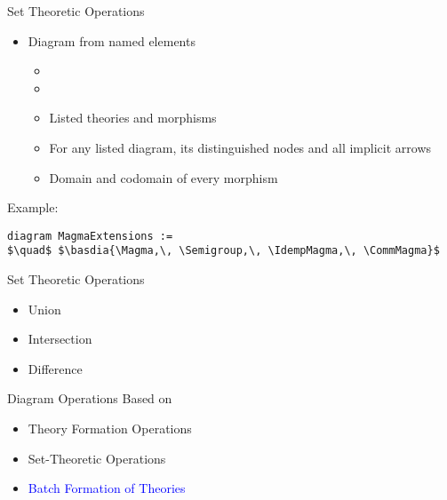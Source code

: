 \documentclass[t,12pt,numbers,fleqn,usenames,xcolor=dvipsnames]{beamer}
\begin{document}
\begin{frame}[fragile]{Set Theoretic Operations}
\begin{itemize}
	\item Diagram from named elements 
\begin{itemize}
	\item[]  
	\item[]
\pause
	\item Listed theories and morphisms 
	\item For any listed diagram, its distinguished nodes and all implicit arrows 
	\item Domain and codomain of every morphism
\end{itemize}
\end{itemize}

\pause
Example: 
\footnotesize
\begin{lstlisting}
diagram MagmaExtensions := 
$\quad$ $\basdia{\Magma,\, \Semigroup,\, \IdempMagma,\, \CommMagma}$
\end{lstlisting}
\end{frame}

\begin{frame}[fragile]{Set Theoretic Operations}
\begin{itemize}
	\item Union 
	\item Intersection 
	\item Difference 
\end{itemize}
\end{frame}

\begin{frame}[fragile]{Diagram Operations}
Based on 
\begin{itemize}
	\item Theory Formation Operations
	\item Set-Theoretic Operations
	\item \textcolor{Blue}{Batch Formation of Theories}
\end{itemize}
\end{frame}
\end{document}
